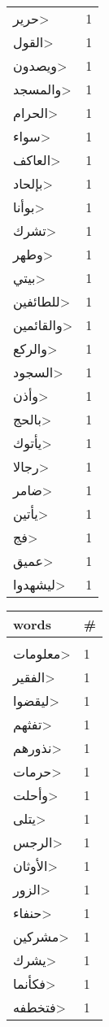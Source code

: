\documentclass{article}
\begin{document}
\begin{multicols}{6}
\begin{center}
\begin{tabular}{ P{2cm}  P{1cm}}
\<حرير> & 1 \\ 
\<القول> & 1 \\ 
\<ويصدون> & 1 \\ 
\<والمسجد> & 1 \\ 
\<الحرام> & 1 \\ 
\<سواء> & 1 \\ 
\<العاكف> & 1 \\ 
\<بإلحاد> & 1 \\ 
\<بوأنا> & 1 \\ 
\<تشرك> & 1 \\ 
\<وطهر> & 1 \\ 
\<بيتي> & 1 \\ 
\<للطائفين> & 1 \\ 
\<والقائمين> & 1 \\ 
\<والركع> & 1 \\ 
\<السجود> & 1 \\ 
\<وأذن> & 1 \\ 
\<بالحج> & 1 \\ 
\<يأتوك> & 1 \\ 
\<رجالا> & 1 \\ 
\<ضامر> & 1 \\ 
\<يأتين> & 1 \\ 
\<فج> & 1 \\ 
\<عميق> & 1 \\ 
\<ليشهدوا> & 1 \\ 
\end{tabular} 
\begin{tabular}{ P{2cm}  P{1cm}} 
\textbf{words}    & \textbf{\#}  \\
\hline
\\[0.01cm]
\<معلومات> & 1 \\ 
\<الفقير> & 1 \\ 
\<ليقضوا> & 1 \\ 
\<تفثهم> & 1 \\ 
\<نذورهم> & 1 \\ 
\<حرمات> & 1 \\ 
\<وأحلت> & 1 \\ 
\<يتلى> & 1 \\ 
\<الرجس> & 1 \\ 
\<الأوثان> & 1 \\ 
\<الزور> & 1 \\ 
\<حنفاء> & 1 \\ 
\<مشركين> & 1 \\ 
\<يشرك> & 1 \\ 
\<فكأنما> & 1 \\ 
\<فتخطفه> & 1 \\ 

\end{tabular}
\end{center}
\end{multicols}
\end{document}
